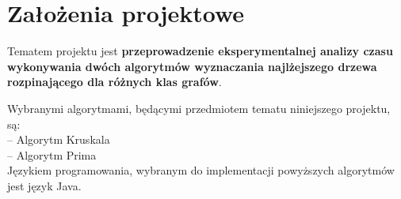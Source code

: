 \chapter [Sprawozdzanie 1] {Założenia projektowe} 
Tematem projektu jest \textbf{przeprowadzenie eksperymentalnej analizy czasu wykonywania dwóch algorytmów wyznaczania najlżejszego drzewa rozpinającego dla różnych klas grafów}.

Wybranymi algorytmami, będącymi przedmiotem tematu niniejszego projektu, są:\\
-- Algorytm Kruskala\\
-- Algorytm Prima\\

Językiem programowania, wybranym do implementacji powyższych algorytmów jest język Java.